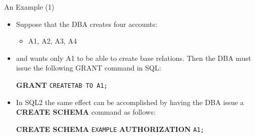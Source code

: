 \begin{frame}{An Example (1)}
    \Large %
    
    \begin{itemize}
        \vspace{-0.5 cm} %
        
        \item Suppose that the DBA creates four accounts:
        \begin{itemize}
            \large
            \item A1, A2, A3, A4
        \end{itemize}
        
        \item and wants only A1 to be able to create base relations. Then the DBA must issue the following GRANT command in SQL:
        
        \vspace{0.3cm} %
        {\normalsize \textbf{GRANT} \texttt{CREATETAB TO A1;}}
        \vspace{0.3cm}
        
        \item In SQL2 the same effect can be accomplished by having the DBA issue a \textbf{CREATE SCHEMA} command as follows:
        
        \vspace{0.3cm}
        {\normalsize \textcolor{red!70!black}{\textbf{CREATE SCHEMA} \texttt{EXAMPLE} \textbf{AUTHORIZATION} \texttt{A1;}}}
        
    \end{itemize}
\end{frame}



